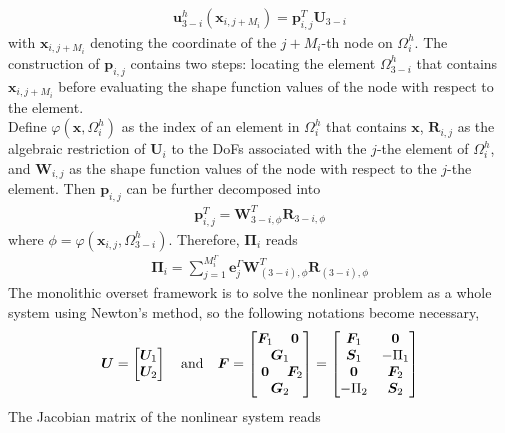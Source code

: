 \documentclass[preprint,12pt,sort&compress]{elsarticle}
\theoremstyle{definition}%
\begin{document}
\begin{align}
  \bm{u}^h_{3-i}({\bm{x}_{i,j+M_i}})=\bm{p}_{i,j}^T \bm{U}_{3-i}
\end{align}
with $\bm{x}_{i,j+M_i}$ denoting the coordinate 
of the $j+M_i$-th node on $\Omega_i^h$. 
The construction of $\bm{p}_{i,j}$ contains two steps: locating the element $\Omega_{3-i}^h$ that contains $\bm{x}_{i,j+M_i}$ before
evaluating the shape function values of the node with respect to the element.\\
Define $\varphi(\bm{x}, \Omega_i^h)$ as the index of an element in $\Omega_i^h$ that contains $\bm{x}$, 
$\bm{R}_{i,j}$ as the algebraic restriction of $\bm{U}_i$ to the DoFs associated with the $j$-the element of $\Omega_i^h$, 
and $\bm{W}_{i,j}$ as the shape function values of the node with respect to the $j$-the element.
Then $\bm{p}_{i,j}$ can be further decomposed into
\begin{align}
  \bm{p}_{i,j}^T = \bm{W}_{3-i,\phi}^T\bm{R}_{3-i,\phi}
\end{align}
where $\phi=\varphi(\bm{x}_{i,j}, \Omega_{3-i}^h)$.
Therefore, $\bm{\Pi}_{i}$ reads
\begin{align}
  \bm{\Pi}_i=\sum_{j=1}^{M^\Gamma_i}\bm{e}^\Gamma_{j} \bm{W}_{(3-i),\phi}^T\bm{R}_{(3-i),\phi}
\end{align}
The monolithic overset framework is to solve the nonlinear problem as a whole system using Newton's method, so the following 
notations become necessary,
\begin{align}
  \bm{U} =
  \begin{bmatrix}
    \bm{U}_{1}\\
    \bm{U}_{2}
  \end{bmatrix}
  \quad\text{and}\quad
  \bm{F} =
  \begin{bmatrix}
    \bm{F}_1 & \bm{0}\\
    \multicolumn{2}{c}{\bm{G}_1}\\
    \bm{0} & \bm{F}_2\\
    \multicolumn{2}{c}{\bm{G}_2}
  \end{bmatrix}
  =
  \begin{bmatrix}
    \bm{F}_1 & \bm{0}\\
    \bm{S}_1 & -\Pi_1\\
    \bm{0} & \bm{F}_2\\
    -\Pi_2 & \bm{S}_2
  \end{bmatrix}
\end{align}
The Jacobian matrix
of the nonlinear system reads
\end{document}
